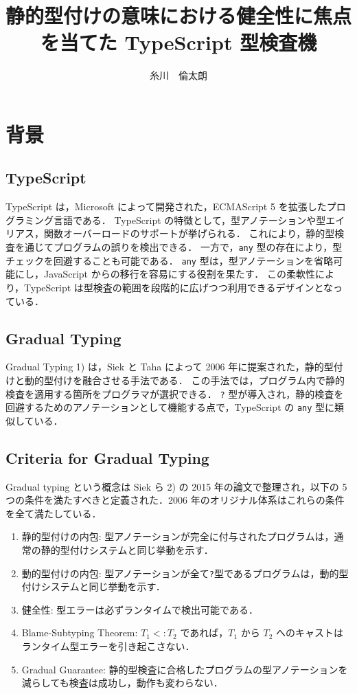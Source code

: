 \documentclass[11pt,twocolumn]{classes/yokou}
\title{静的型付けの意味における健全性に焦点を当てた TypeScript 型検査機}
\author{糸川　倫太朗}
\begin{document}
\maketitle

\section{背景}

\subsection{TypeScript}

TypeScript は，Microsoft によって開発された，ECMAScript 5 を拡張したプログラミング言語である．
TypeScript の特徴として，型アノテーションや型エイリアス，関数オーバーロードのサポートが挙げられる．
これにより，静的型検査を通じてプログラムの誤りを検出できる．
一方で，\texttt{any} 型の存在により，型チェックを回避することも可能である．
\texttt{any} 型は，型アノテーションを省略可能にし，JavaScript からの移行を容易にする役割を果たす．
この柔軟性により，TypeScript は型検査の範囲を段階的に広げつつ利用できるデザインとなっている．

\subsection{Gradual Typing}

Gradual Typing 1) は，Siek と Taha によって 2006 年に提案された，静的型付けと動的型付けを融合させる手法である．
この手法では，プログラム内で静的検査を適用する箇所をプログラマが選択できる．
\texttt{?} 型が導入され，静的検査を回避するためのアノテーションとして機能する点で，TypeScript の \texttt{any} 型に類似している．

\subsection{Criteria for Gradual Typing}

Gradual typing という概念は Siek ら 2) の 2015 年の論文で整理され，以下の 5 つの条件を満たすべきと定義された．2006 年のオリジナル体系はこれらの条件を全て満たしている．

\begin{enumerate}
	\item 静的型付けの内包: 型アノテーションが完全に付与されたプログラムは，通常の静的型付けシステムと同じ挙動を示す．
	\item 動的型付けの内包: 型アノテーションが全て\texttt{?}型であるプログラムは，動的型付けシステムと同じ挙動を示す．
	\item 健全性: 型エラーは必ずランタイムで検出可能である．
	\item Blame-Subtyping Theorem: $T_1 <: T_2$ であれば，$T_1$ から $T_2$ へのキャストはランタイム型エラーを引き起こさない．
	\item Gradual Guarantee: 静的型検査に合格したプログラムの型アノテーションを減らしても検査は成功し，動作も変わらない．
\end{enumerate}
\end{document}
